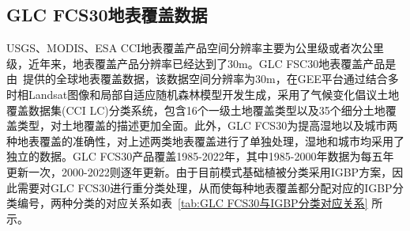 \subsection{GLC FCS30地表覆盖数据}\label{GLC FCS30地表覆盖数据}
USGS、MODIS、ESA CCI地表覆盖产品空间分辨率主要为公里级或者次公里级，近年来，地表覆盖产品分辨率已经达到了30m。GLC FSC30地表覆盖产品是由~\citet{zhang2023glc_fcs30d}提供的全球地表覆盖数据，该数据空间分辨率为30m，在GEE平台通过结合多时相Landsat图像和局部自适应随机森林模型开发生成，采用了气候变化倡议土地覆盖数据集(CCI LC)分类系统，包含16个一级土地覆盖类型以及35个细分土地覆盖类型，对土地覆盖的描述更加全面。此外，GLC FCS30为提高湿地以及城市两种地表覆盖的准确性，对上述两类地表覆盖进行了单独处理，湿地和城市均采用了独立的数据。GLC FCS30产品覆盖1985-2022年，其中1985-2000年数据为每五年更新一次，2000-2022则逐年更新。由于目前模式基础植被分类采用IGBP方案，因此需要对GLC FCS30进行重分类处理，从而使每种地表覆盖都分配对应的IGBP分类编号，两种分类的对应关系如表~\ref{tab:GLC FCS30与IGBP分类对应关系} 所示。
%
